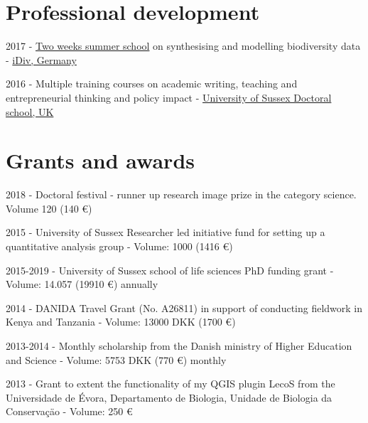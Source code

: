 \documentclass[12pt,a4paper,serif]{moderncv}        %
\begin{document}
\vspace{8pt}

\section{Professional development}

\begin{bibenum}

    \item[] 2017 - \href{https://www.idiv.de/en/events/summer_school.html}{Two weeks summer school} on synthesising and modelling biodiversity data - \href{http://www.idiv.de}{iDiv, Germany}
    
    \item[] 2016 - Multiple training courses on academic writing, teaching and entrepreneurial thinking and policy impact - \href{http://www.sussex.ac.uk}{University of Sussex Doctoral school, UK}

\end{bibenum}

\vspace{8pt}

\section{Grants and awards}

\begin{bibenum}
    \item[] 2018 - Doctoral festival - runner up research image prize in the category science. Volume 120 \textsterling \hspace{1pt} (140 \euro )
    \item[] 2015 - University of Sussex Researcher led initiative fund for setting up a quantitative analysis group - Volume: 1000  \textsterling \hspace{1pt} (1416 \euro )
    \item[] 2015-2019 - University of Sussex school of life sciences PhD funding grant - Volume: 14.057 \textsterling \hspace{1pt} (19910 \euro) annually 
    \item[] 2014 - DANIDA Travel Grant (No. A26811) in support of conducting fieldwork in Kenya and Tanzania - Volume: 13000 DKK (1700 \euro)
    \item[] 2013-2014 - Monthly scholarship from the Danish ministry of Higher Education and Science - Volume: 5753 DKK (770 \euro) monthly
    \item[] 2013 - Grant to extent the functionality of my QGIS plugin LecoS from the Universidade de \'{E}vora, Departamento de Biologia, Unidade de Biologia da Conserva\c{c}\"{a}o  - Volume: 250 \euro

\end{bibenum}
\end{document}
